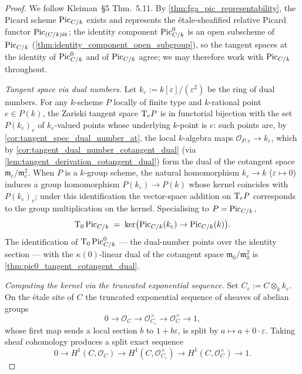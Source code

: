 \begin{proof}
  We follow Kleiman~\S 5 Thm.~5.11. By
  \cref{thm:fga_pic_representability}, the Picard scheme
  \(\operatorname{Pic}_{C/k}\) exists and represents the étale-sheafified relative
  Picard functor \(\operatorname{Pic}_{(C/k)\mathrm{\acute{e}t}}\); the identity component
  \(\operatorname{Pic}^0_{C/k}\) is an open subscheme of \(\operatorname{Pic}_{C/k}\)
  (\cref{thm:identity_component_open_subgroup}), so the tangent
  spaces at the identity of \(\operatorname{Pic}^0_{C/k}\) and of \(\operatorname{Pic}_{C/k}\)
  agree; we may therefore work with \(\operatorname{Pic}_{C/k}\) throughout.

  \emph{Tangent space via dual numbers.} Let
  \(k_\varepsilon := k[\varepsilon]/(\varepsilon^2)\) be the ring of
  dual numbers. For any \(k\)-scheme \(P\) locally of finite type and
  \(k\)-rational point \(e \in P(k)\), the Zariski tangent space
  \(\textup T_e P\) is in functorial bijection with the set
  \(P(k_\varepsilon)_e\) of \(k_\varepsilon\)-valued points whose
  underlying \(k\)-point is \(e\): such points are, by
  \cref{cor:tangent_spec_dual_number_at}, the local
  \(k\)-algebra maps \(\mathcal O_{P,e} \to k_\varepsilon\), which by
  \cref{cor:tangent_dual_number_cotangent_dual} (via
  \cref{lem:tangent_derivation_cotangent_dual}) form the dual of the
  cotangent space
  \(\mathfrak m_e/\mathfrak m_e^2\). When \(P\) is a \(k\)-group scheme,
  the natural homomorphism \(k_\varepsilon \to k\) (\(\varepsilon
  \mapsto 0\)) induces a group homomorphism
  \(P(k_\varepsilon) \to P(k)\) whose kernel coincides with
  \(P(k_\varepsilon)_e\); under this identification the vector-space
  addition on \(\textup T_e P\) corresponds to the group multiplication on
  the kernel. Specialising to \(P = \operatorname{Pic}_{C/k}\),
  \[
    \textup T_0 \operatorname{Pic}_{C/k}
    \;=\; \ker\bigl(\operatorname{Pic}_{C/k}(k_\varepsilon) \to \operatorname{Pic}_{C/k}(k)\bigr).
  \]
  The identification of \(\textup T_0 \operatorname{Pic}^0_{C/k}\) — the dual-number
  points over the identity section — with the
  \(\kappa(0)\)-linear dual of the cotangent space
  \(\mathfrak m_0/\mathfrak m_0^2\) is
  \cref{thm:pic0_tangent_cotangent_dual}.

  \emph{Computing the kernel via the truncated exponential sequence.}
  Set \(C_\varepsilon := C \otimes_k k_\varepsilon\). On the étale
  site of \(C\) the truncated exponential sequence of sheaves of
  abelian groups
  \[
    0 \to \mathcal{O}_C \to \mathcal{O}_{C_\varepsilon}^{\times}
        \to \mathcal{O}_C^{\times} \to 1,
  \]
  whose first map sends a local section \(b\) to \(1 + b\varepsilon\),
  is split by \(a \mapsto a + 0 \cdot \varepsilon\). Taking sheaf
  cohomology produces a split exact sequence
  \[
    0 \to H^1(C, \mathcal{O}_C)
      \to H^1(C, \mathcal{O}_{C_\varepsilon}^{\times})
      \to H^1(C, \mathcal{O}_C^{\times}) \to 1.
  \]


\end{proof}
